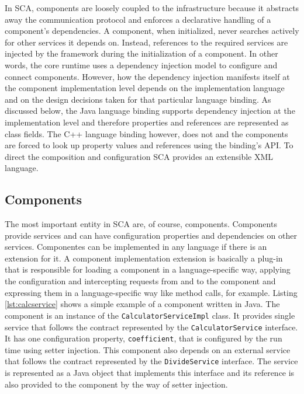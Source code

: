 In SCA, components are loosely coupled to the infrastructure because it abstracts away the communication protocol
and enforces a declarative handling of a component's dependencies. A component, when initialized, never searches
actively for other services it depends on. Instead, references to the required services are injected by the framework
during the initialization of a component. In other words, the core runtime uses a dependency injection model to
configure and connect components. However, how the dependency injection manifests itself at the component implementation
level depends on the implementation language and on the design decisions taken for that particular language binding.
As discussed below, the Java language binding supports dependency injection at the implementation level and therefore
properties and references are represented as class fields. The C++ language binding however, does not and the components
are forced to look up property values and references using the binding's API.
To direct the composition and configuration SCA provides an extensible XML language.

\subsection{Components}

The most important entity in SCA are, of course, components. Components provide services and can have configuration properties
and dependencies on other services. Componentes can be implemented in any language if there is an extension for it. A component
implementation extension is basically a plug-in that is responsible for loading a component in a language-specific way, applying
the configuration and intercepting requests from and to the component and expressing them in a language-specific way like method
calls, for example. Listing \ref{lst:calcservice} shows a simple example of a component written in Java. The component is an instance
of the \texttt{CalculatorServiceImpl} class. It provides single service that follows the contract represented by the \texttt{CalculatorService}
interface. It has one configuration property, \texttt{coefficient}, that is configured by the run time using setter injection.
This component also depends on an external service that follows the contract represented by the \texttt{DivideService} interface.
The service is represented as a Java object that implements this interface and its reference is also provided to the component
by the way of setter injection.

